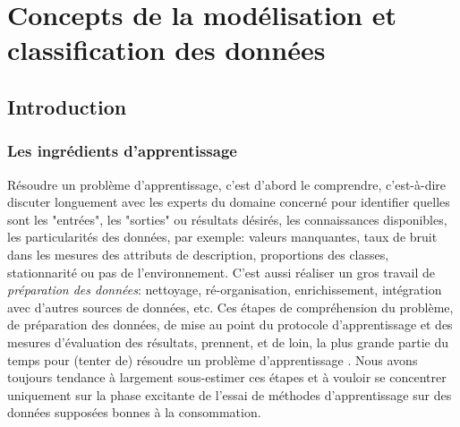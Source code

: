 	

		
%
%


\section{Concepts de la modélisation et classification des données}
	\subsection{Introduction}
	\subsubsection{Les ingrédients d'apprentissage}
		Résoudre un problème d'apprentissage, c'est d'abord le comprendre, c'est-à-dire discuter longuement avec les experts du domaine concerné pour identifier quelles sont les "entrées", les  "sorties" ou résultats désirés, les connaissances disponibles, les particularités des données, par exemple: valeurs manquantes, taux de bruit dans les mesures des attributs de description, proportions des classes, stationnarité ou pas de l'environnement. 
		C'est aussi réaliser un gros travail de \textit{préparation des données}: nettoyage, ré-organisation, enrichissement, intégration avec d'autres sources de données, etc. Ces étapes de compréhension du problème, de préparation des données, de mise au point du protocole d'apprentissage et des mesures d'évaluation des résultats, prennent, et de loin, la plus grande partie du temps pour (tenter de) résoudre un problème d'apprentissage \cite{antoine2018apprentissage}. 
		Nous avons toujours tendance à largement sous-estimer ces étapes et à vouloir se concentrer uniquement sur la phase excitante de l'essai de méthodes d'apprentissage sur des données supposées bonnes à la consommation. 
	
